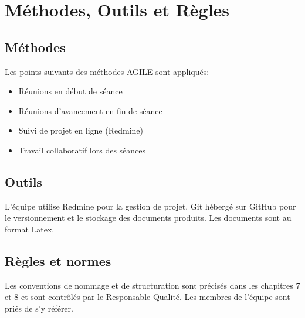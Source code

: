 \section{Méthodes, Outils et Règles}

\subsection{Méthodes}
Les points suivants des méthodes AGILE sont appliqués:
\begin{itemize}
\item Réunions en début de séance
\item Réunions d'avancement en fin de séance
\item Suivi de projet en ligne (Redmine)
\item Travail collaboratif lors des séances
\end{itemize}

\subsection{Outils}
L'équipe utilise Redmine pour la gestion de projet. Git hébergé sur GitHub pour le versionnement et le stockage
des documents produits. Les documents sont au format Latex.
\subsection{Règles et normes}
Les conventions de nommage et de structuration sont précisés dans les chapitres 7 et 8 et sont contrôlés
par le Responsable Qualité. Les membres de l'équipe sont priés de s'y référer.
\vfill
\pagebreak
